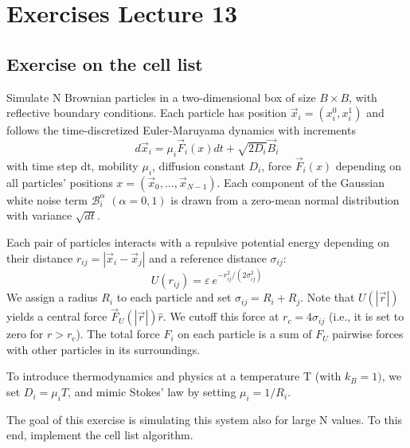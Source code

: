 \documentclass[../main.tex]{subfiles}
\begin{document}
\chapter{Exercises Lecture 13}

\section{Exercise on the cell list}

Simulate N Brownian particles in a two-dimensional box of size $B\times B$, with reflective boundary conditions. Each particle has position $\vec{x}_{i}=(x_{i}^{0},x_{i}^{1})$ and follows the time-discretized Euler-Maruyama dynamics with increments
$$d\vec{x}_{i}=\mu_{i}\vec{F}_{i}(x)dt+\sqrt{2D_{i}}\vec{B}_{i}$$
with time step dt, mobility $\mu_{i}$, diffusion constant $D_{i}$, force $\vec{F}_{i}(x)$ depending on all particles' positions $x=(\vec{x}_{0},...,\vec{x}_{N-1})$. Each component of the Gaussian white noise term $\mathcal{B}_{i}^{\alpha}$ $(\alpha=0,1)$ is drawn from a zero-mean normal distribution with variance $\sqrt{dt}$.

Each pair of particles interacts with a repulsive potential energy depending on their distance $r_{ij}=|\vec{x}_{i}-\vec{x}_{j}|$ and a reference distance $\sigma_{ij}$:
$$U(r_{ij})=\varepsilon~e^{-r_{ij}^{2}/(2\sigma_{ij}^{2})}$$
We assign a radius $R_{i}$ to each particle and set $\sigma_{ij}=R_{i}+R_{j}$. Note that $U(|\vec{r}|)$ yields a central force $\vec{F}_{U}(|\vec{r}|)\hat{r}$. We cutoff this force at $r_{c}=4\sigma_{ij}$ (i.e., it is set to zero for $r>r_{c}$). The total force $F_{i}$ on each particle is a sum of $F_{U}$ pairwise forces with other particles in its surroundings.

To introduce thermodynamics and physics at a temperature T (with $k_{B}=1)$, we set $D_{i}=\mu_{i}T$, and mimic Stokes' law by setting $\mu_{i}=1/R_{i}$.

The goal of this exercise is simulating this system also for large N values. To this end, implement the cell list algorithm.
\end{document}
